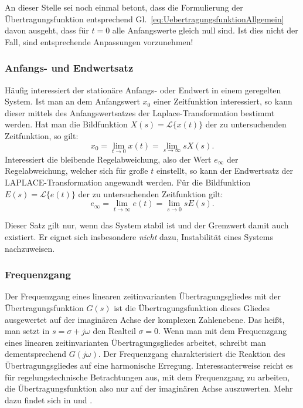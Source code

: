 \begin{RstWichtigBox}
  An dieser Stelle sei noch einmal betont, dass die Formulierung der Übertragungsfunktion entsprechend Gl.~\eqref{eq:UebertragungsfunktionAllgemein} davon ausgeht, dass für $t=0$ alle Anfangswerte gleich null sind. Ist dies nicht der Fall, sind entsprechende Anpassungen vorzunehmen!
\end{RstWichtigBox}

\subsubsection{Anfangs- und Endwertsatz} \label{sec:endwertsatze}
Häufig interessiert der stationäre Anfangs- oder Endwert in einem geregelten System. Ist man an dem Anfangswert $x_0$ einer Zeitfunktion interessiert, so kann dieser mittels des
Anfangswertsatzes der Laplace-Transformation bestimmt werden.
Hat man die Bildfunktion $X(s) = \mathcal{L}\{x(t)\}$ der zu untersuchenden Zeitfunktion, so gilt:
\begin{equation} \label{eq:Anfangswertsatz}
  x_0 = \lim_{t \to 0} x(t) = \lim_{s \to \infty} s X(s).
\end{equation}
Interessiert die bleibende Regelabweichung, also der Wert $e_\infty$ der Regelabweichung, welcher sich für große $t$ einstellt, so kann der Endwertsatz der LAPLACE-Transformation angewandt werden. Für die Bildfunktion $E(s) = \mathcal{L}\{e(t)\}$ der zu untersuchenden Zeitfunktion gilt:
\begin{equation}\label{eq:Endwertsatz}
  e_\infty = \lim_{t \to \infty} e(t) = \lim_{s \to 0} s E(s).
\end{equation}


\begin{RstWichtigBox}
  Dieser Satz gilt nur, wenn das System stabil ist und der Grenzwert damit auch existiert. Er eignet sich insbesondere \emph{nicht} dazu, Instabilität eines Systems nachzuweisen.
\end{RstWichtigBox}
\subsubsection{Frequenzgang}
\label{sec:frequenzgang}
Der Frequenzgang eines linearen zeitinvarianten Übertragungsgliedes mit der Übertragungsfunktion $G(s)$ ist die Übertragungsfunktion dieses Gliedes ausgewertet auf der imaginären Achse der komplexen Zahlenebene. Das heißt, man setzt in $s = \sigma + j\omega$ den Realteil $\sigma = 0$.
Wenn man mit dem Frequenzgang eines linearen zeitinvarianten Übertragungsgliedes arbeitet, schreibt man dementsprechend $G(j\omega)$. Der Frequenzgang charakterisiert die Reaktion des Übertragungsgliedes auf eine harmonische Erregung.
Interessanterweise reicht es für regelungstechnische Betrachtungen aus, mit dem Frequenzgang zu arbeiten, die Übertragungsfunktion also nur auf der imaginären Achse auszuwerten. Mehr dazu findet sich in \cite[Kapitel 5]{ReinschkeAlt} und \cite[Kapitel 5]{Reinschke}.

